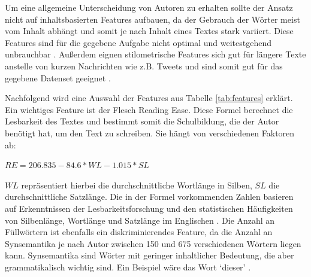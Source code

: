 \documentclass[conference]{IEEEtran}
\begin{document}
	Um eine allgemeine Unterscheidung von Autoren zu erhalten sollte der Ansatz nicht auf inhaltsbasierten Features aufbauen, da der Gebrauch der Wörter meist vom Inhalt abhängt und somit je nach Inhalt eines Textes stark variiert. Diese Features sind für die gegebene Aufgabe nicht optimal und weitestgehend unbrauchbar \cite{mf_b2}.
	Außerdem eignen stilometrische Features sich gut für längere Texte anstelle von kurzen Nachrichten wie z.B. Tweets und sind somit gut für das gegebene Datenset geeignet \cite{mf_b3}.
	
	Nachfolgend wird eine Auswahl der Features aus Tabelle \ref{tab:features} erklärt.
	Ein wichtiges Feature ist der Flesch Reading Ease. Diese Formel berechnet die Lesbarkeit des Textes und bestimmt somit die Schulbildung, die der Autor benötigt hat, um den Text zu schreiben. Sie hängt von verschiedenen Faktoren ab:
	
	
	$RE = 206.835 - 84.6*WL - 1.015*SL$
	
	
	
	$WL$ repräsentiert hierbei die durchschnittliche Wortlänge in Silben, $SL$ die durchschnittliche Satzlänge. Die in der Formel vorkommenden Zahlen basieren auf Erkenntnissen der Lesbarkeitsforschung und den statistischen Häufigkeiten von Silbenlänge, Wortlänge und Satzlänge im Englischen \cite{mf_b4}.
	Die Anzahl an Füllwörtern ist ebenfalls ein diskriminierendes Feature, da die Anzahl an Synsemantika je nach Autor zwischen 150 und 675 verschiedenen Wörtern liegen kann. Synsemantika sind Wörter mit geringer inhaltlicher Bedeutung, die aber grammatikalisch wichtig sind. Ein Beispiel wäre das Wort ‘dieser’ \cite{mf_b5}.
	
\end{document}
